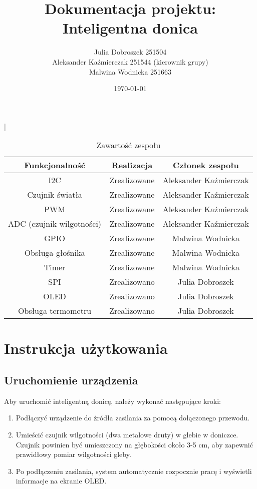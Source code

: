\documentclass{article}
\title{Dokumentacja projektu: Inteligentna donica}
\author{
  Julia Dobroszek 251504 \\
  Aleksander Kaźmierczak 251544 (kierownik grupy)\\
  Malwina Wodnicka 251663 \\  
}
\date{\today}
\begin{document}
\maketitle

|%
\begin{table}[H]
    \centering
    \begin{tabular}{|c|c|c|}
    \hline
    Funkcjonalność & Realizacja & Członek zespołu\\
    \hline
    I2C & Zrealizowane & Aleksander Kaźmierczak \\
    Czujnik światła & Zrealizowane & Aleksander Kaźmierczak \\
    PWM & Zrealizowane & Aleksander Kaźmierczak \\
    ADC (czujnik wilgotności) & Zrealizowane & Aleksander Kaźmierczak \\
    \hline
    GPIO & Zrealizowane & Malwina Wodnicka \\
    Obsługa głośnika & Zrealizowane & Malwina Wodnicka \\
    Timer & Zrealizowane & Malwina Wodnicka \\
    \hline
    SPI & Zrealizowano & Julia Dobroszek \\
    OLED & Zrealizowano & Julia Dobroszek \\
    Obsługa termometru & Zrealizowano & Julia Dobroszek \\
    
    \hline
    \end{tabular}
    \caption{Zawartość zespołu}
\end{table}


\section{Instrukcja użytkowania}

\subsection{Uruchomienie urządzenia}
Aby uruchomić inteligentną donicę, należy wykonać następujące kroki:
\begin{enumerate}
    \item Podłączyć urządzenie do źródła zasilania za pomocą dołączonego przewodu.
    \item Umieścić czujnik wilgotności (dwa metalowe druty) w glebie w doniczce. Czujnik powinien być umieszczony na głębokości około 3-5 cm, aby zapewnić prawidłowy pomiar wilgotności gleby.
    \item Po podłączeniu zasilania, system automatycznie rozpocznie pracę i wyświetli informacje na ekranie OLED.
    
\end{enumerate}
\end{document}
